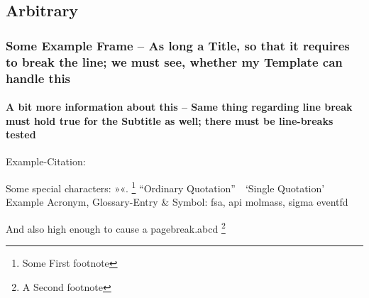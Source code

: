 \subsection{Arbitrary}

\begin{frame}[c,allowframebreaks]
\frametitle{Some Example Frame -- As long a Title, so that it requires to break the line; we must see, whether my Template can handle this}
\framesubtitle{A bit more information about this -- Same thing regarding line break must hold true for the Subtitle as well; there must be line-breaks tested}
	Example-Citation:
	\cite{DenKr_denkrement1_indeco}

	\npi%
	Some special characters:
	»«.
	\footnote[frame]{Some First footnote}
	\nl%
	\nl
	\enquote{Ordinary Quotation}\ \ \enquote*{Single Quotation}
	\nl%
	Example Acronym, Glossary-Entry \& Symbol:\nl
	\gls{fsa}, \gls{api}\nl
	\gls{molmass}, \gls{sigma}\nl
	\gls{eventfd}

	\npi
	And also high enough to cause a pagebreak.\nl a\nl b\nl c\nl d
	\footnote[frame]{A Second footnote}
\end{frame}



